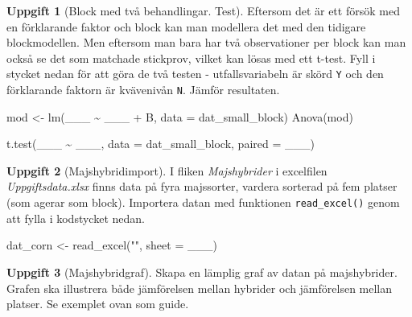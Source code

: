 \documentclass[
]{book}
\newenvironment{Shaded}{\begin{snugshade}}{\end{snugshade}}
\newcommand{\AttributeTok}[1]{\textcolor[rgb]{0.77,0.63,0.00}{#1}}
\newcommand{\FunctionTok}[1]{\textcolor[rgb]{0.00,0.00,0.00}{#1}}
\newcommand{\NormalTok}[1]{#1}
\newcommand{\OtherTok}[1]{\textcolor[rgb]{0.56,0.35,0.01}{#1}}
\newcommand{\SpecialCharTok}[1]{\textcolor[rgb]{0.00,0.00,0.00}{#1}}
\newcommand{\StringTok}[1]{\textcolor[rgb]{0.31,0.60,0.02}{#1}}
\theoremstyle{definition}
\theoremstyle{definition}
\theoremstyle{definition}
\newtheorem{exercise}{Uppgift}[chapter]
\theoremstyle{definition}
\theoremstyle{remark}
\begin{document}
\begin{exercise}[Block med två behandlingar. Test]

Eftersom det är ett försök med en förklarande faktor och block kan man modellera det med den tidigare blockmodellen. Men eftersom man bara har två observationer per block kan man också se det som matchade stickprov, vilket kan lösas med ett t-test. Fyll i stycket nedan för att göra de två testen - utfallsvariabeln är skörd \texttt{Y} och den förklarande faktorn är kvävenivån \texttt{N}. Jämför resultaten.

\begin{Shaded}
\begin{Highlighting}[]
\NormalTok{mod }\OtherTok{\textless{}{-}} \FunctionTok{lm}\NormalTok{(\_\_\_ }\SpecialCharTok{\textasciitilde{}}\NormalTok{ \_\_\_ }\SpecialCharTok{+}\NormalTok{ B, }\AttributeTok{data =}\NormalTok{ dat\_small\_block)}
\FunctionTok{Anova}\NormalTok{(mod)}

\FunctionTok{t.test}\NormalTok{(\_\_\_ }\SpecialCharTok{\textasciitilde{}}\NormalTok{ \_\_\_, }\AttributeTok{data =}\NormalTok{ dat\_small\_block, }\AttributeTok{paired =}\NormalTok{ \_\_\_)}
\end{Highlighting}
\end{Shaded}

\end{exercise}

\begin{exercise}[Majshybridimport]

I fliken \emph{Majshybrider} i excelfilen \emph{Uppgiftsdata.xlsx} finns data på fyra majssorter, vardera sorterad på fem platser (som agerar som block). Importera datan med funktionen \texttt{read\_excel()} genom att fylla i kodstycket nedan.

\begin{Shaded}
\begin{Highlighting}[]
\NormalTok{dat\_corn }\OtherTok{\textless{}{-}} \FunctionTok{read\_excel}\NormalTok{(}\StringTok{""}\NormalTok{, }\AttributeTok{sheet =}\NormalTok{ \_\_\_)}
\end{Highlighting}
\end{Shaded}

\end{exercise}

\begin{exercise}[Majshybridgraf]
Skapa en lämplig graf av datan på majshybrider. Grafen ska illustrera både jämförelsen mellan hybrider och jämförelsen mellan platser. Se exemplet ovan som guide.
\end{exercise}
\end{document}
